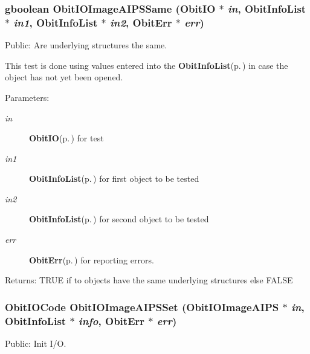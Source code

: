 \subsubsection{\setlength{\rightskip}{0pt plus 5cm}gboolean Obit\-IOImage\-AIPSSame ({\bf Obit\-IO} $\ast$ {\em in}, {\bf Obit\-Info\-List} $\ast$ {\em in1}, {\bf Obit\-Info\-List} $\ast$ {\em in2}, {\bf Obit\-Err} $\ast$ {\em err})}\label{ObitIOImageAIPS_8c_a8}


Public: Are underlying structures the same. 

This test is done using values entered into the {\bf Obit\-Info\-List}{\rm (p.\,\pageref{structObitInfoList})} in case the object has not yet been opened. \begin{Desc}
\item[Parameters:]
\begin{description}
\item[{\em in}]{\bf Obit\-IO}{\rm (p.\,\pageref{structObitIO})} for test \item[{\em in1}]{\bf Obit\-Info\-List}{\rm (p.\,\pageref{structObitInfoList})} for first object to be tested \item[{\em in2}]{\bf Obit\-Info\-List}{\rm (p.\,\pageref{structObitInfoList})} for second object to be tested \item[{\em err}]{\bf Obit\-Err}{\rm (p.\,\pageref{structObitErr})} for reporting errors. \end{description}
\end{Desc}
\begin{Desc}
\item[Returns:]TRUE if to objects have the same underlying structures else FALSE \end{Desc}
\subsubsection{\setlength{\rightskip}{0pt plus 5cm}Obit\-IOCode Obit\-IOImage\-AIPSSet ({\bf Obit\-IOImage\-AIPS} $\ast$ {\em in}, {\bf Obit\-Info\-List} $\ast$ {\em info}, {\bf Obit\-Err} $\ast$ {\em err})}\label{ObitIOImageAIPS_8c_a14}


Public: Init I/O. 

